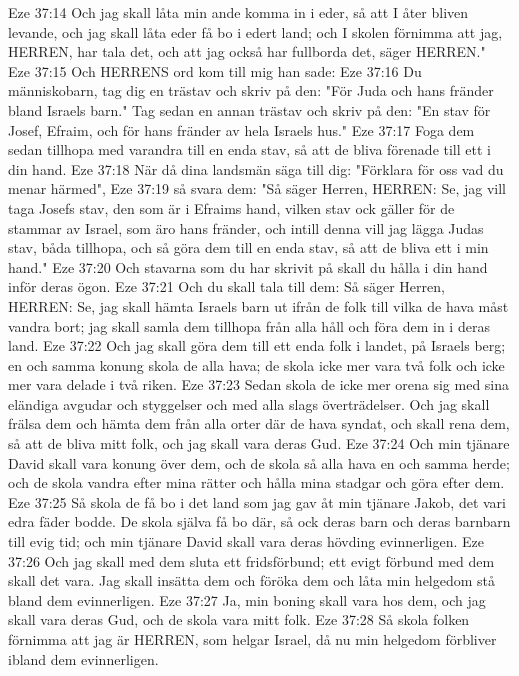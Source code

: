 Eze 37:14  Och jag skall låta min ande komma in i eder, så att I åter bliven levande, och jag skall låta eder få bo i edert land; och I skolen förnimma att jag, HERREN, har tala det, och att jag också har fullborda det, säger HERREN."
Eze 37:15  Och HERRENS ord kom till mig han sade:
Eze 37:16  Du människobarn, tag dig en trästav och skriv på den: "För Juda och hans fränder bland Israels barn." Tag sedan en annan trästav och skriv på den: "En stav för Josef, Efraim, och för hans fränder av hela Israels hus."
Eze 37:17  Foga dem sedan tillhopa med varandra till en enda stav, så att de bliva förenade till ett i din hand.
Eze 37:18  När då dina landsmän säga till dig: "Förklara för oss vad du menar härmed",
Eze 37:19  så svara dem: "Så säger Herren, HERREN: Se, jag vill taga Josefs stav, den som är i Efraims hand, vilken stav ock gäller för de stammar av Israel, som äro hans fränder, och intill denna vill jag lägga Judas stav, båda tillhopa, och så göra dem till en enda stav, så att de bliva ett i min hand."
Eze 37:20  Och stavarna som du har skrivit på skall du hålla i din hand inför deras ögon.
Eze 37:21  Och du skall tala till dem: Så säger Herren, HERREN: Se, jag skall hämta Israels barn ut ifrån de folk till vilka de hava måst vandra bort; jag skall samla dem tillhopa från alla håll och föra dem in i deras land.
Eze 37:22  Och jag skall göra dem till ett enda folk i landet, på Israels berg; en och samma konung skola de alla hava; de skola icke mer vara två folk och icke mer vara delade i två riken.
Eze 37:23  Sedan skola de icke mer orena sig med sina eländiga avgudar och styggelser och med alla slags överträdelser. Och jag skall frälsa dem och hämta dem från alla orter där de hava syndat, och skall rena dem, så att de bliva mitt folk, och jag skall vara deras Gud.
Eze 37:24  Och min tjänare David skall vara konung över dem, och de skola så alla hava en och samma herde; och de skola vandra efter mina rätter och hålla mina stadgar och göra efter dem.
Eze 37:25  Så skola de få bo i det land som jag gav åt min tjänare Jakob, det vari edra fäder bodde. De skola själva få bo där, så ock deras barn och deras barnbarn till evig tid; och min tjänare David skall vara deras hövding evinnerligen.
Eze 37:26  Och jag skall med dem sluta ett fridsförbund; ett evigt förbund med dem skall det vara. Jag skall insätta dem och föröka dem och låta min helgedom stå bland dem evinnerligen.
Eze 37:27  Ja, min boning skall vara hos dem, och jag skall vara deras Gud, och de skola vara mitt folk.
Eze 37:28  Så skola folken förnimma att jag är HERREN, som helgar Israel, då nu min helgedom förbliver ibland dem evinnerligen.
